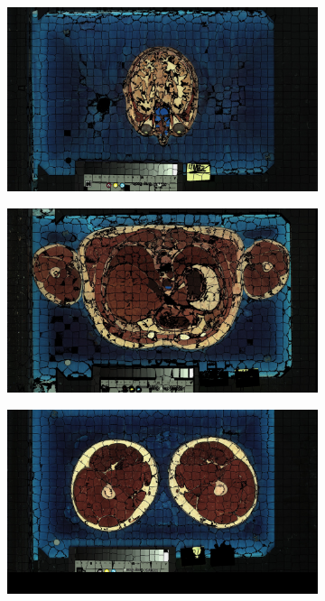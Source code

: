 \documentclass{InsightArticle}
\begin{document}
\begin{figure}
\centering
\begin{subfigure}{0.67\textwidth}
  \includegraphics[width=1.0\textwidth]{images/vh_slic_masked_110.jpg}
  \label{fig:a}
\end{subfigure}
\begin{subfigure}{0.67\textwidth}
  \includegraphics[width=1.0\textwidth]{images/vh_slic_masked_487.jpg}
  \label{fig:b}
\end{subfigure}
\begin{subfigure}{0.67\textwidth}
  \includegraphics[width=1.0\textwidth]{images/vh_slic_masked_1116.jpg}

\end{subfigure}
\end{figure}
\end{document}
